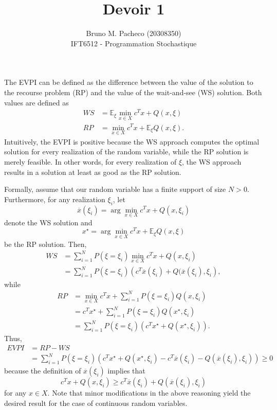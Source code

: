 \documentclass[a4paper]{report}
\begin{document}
 
\title{Devoir 1}
\author{Bruno M. Pacheco (20308350) \\
IFT6512 - Programmation Stochastique}
 
\maketitle
 

The EVPI can be defined as the difference between the value of the solution to the recourse problem (RP) and the value of the wait-and-see (WS) solution.
Both values are defined as 
\begin{align*}
    WS &= \mathbb{E}_\xi \min_{x\in X} c^Tx + Q(x,\xi) \\
    RP &= \min_{x\in X} c^Tx + \mathbb{E}_\xi Q(x,\xi)
.\end{align*}
Intuitively, the EVPI is positive because the WS approach computes the optimal solution for every realization of the random variable, while the RP solution is merely feasible.
In other words, for every realization of $\xi$, the WS approach results in a solution at least as good as the RP solution.

Formally, assume that our random variable has a finite support of size $N>0$.
Furthermore, for any realization $\xi_i$, let \[
\overline{x}(\xi_i) = \arg\min_{x\in X} c^Tx  + Q(x,\xi_i)
\] denote the WS solution and \[
x^{\star} = \arg\min_{x\in X} c^Tx + \mathbb{E}_\xi Q(x,\xi)
\] be the RP solution.
Then,
\begin{align*}
    WS &= \sum_{i=1}^{N} P(\xi = \xi_i) \min_{x\in X} c^Tx + Q(x, \xi_i) \\
       &= \sum_{i=1}^{N} P(\xi = \xi_i)\left( c^{T}\overline{x}(\xi_i) + Q(\overline{x}(\xi_i),\xi_i \right) 
,\end{align*}
while
\begin{align*}
    RP &= \min_{x\in X} c^Tx + \sum_{i=1}^{N} P(\xi=\xi_i) Q(x,\xi_i) \\
    &= c^{T}x^{\star} + \sum_{i=1}^{N} P(\xi=\xi_i) Q(x^{\star},\xi_i) \\
    &= \sum_{i=1}^{N} P(\xi=\xi_i)\left( c^{T}x^{\star} + Q(x^{\star},\xi_i) \right)
.\end{align*}
Thus,
\begin{align*}
    EVPI &= RP - WS \\
	 &= \sum_{i=1}^{N} P(\xi=\xi_i)\left( c^{T}x^{\star} + Q(x^{\star},\xi_i) - c^{T}\overline{x}(\xi_i) - Q(\overline{x}(\xi_i),\xi_i) \right) \ge 0
\end{align*}
because the definition of $\overline{x}(\xi_i)$ implies that \[
c^{T}x + Q(x,\xi_i) \ge c^{T}\overline{x}(\xi_i) + Q(\overline{x}(\xi_i),\xi_i)
\] for any $x\in X$.
Note that minor modifications in the above reasoning yield the desired result for the case of continuous random variables.
\end{document}
